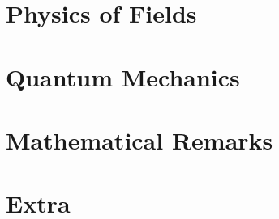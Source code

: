 \chapter{Physics of Fields}




% 
% 
% 
% 


\chapter{Quantum Mechanics}




\chapter{Mathematical Remarks}




\chapter{Extra}









\backmatter
\renewcommand{\emph}[1]{\textit{#1}}
\printbibliography


